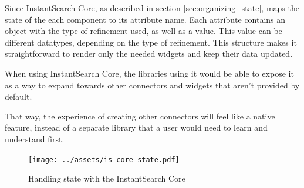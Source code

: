 Since InstantSearch Core, as described in section \ref{sec:organizing_state}, maps the state of the each component to its \gls{attribute} name. Each attribute contains an object with the type of refinement used, as well as a value. This value can be different datatypes, depending on the type of refinement. This structure makes it straightforward to render only the needed widgets and keep their data updated.

When using InstantSearch Core, the libraries using it would be able to expose it as a way to expand towards other connectors and widgets that aren't provided by default.

That way, the experience of creating other connectors will feel like a native feature, instead of a separate \gls{library} that a user would need to learn and understand first.

\begin{figure}[H]
  \centering
  \texttt{[image: ../assets/is-core-state.pdf]}
  \caption{Handling state with the InstantSearch Core}
  \label{figure:is-core-state}
\end{figure} %


